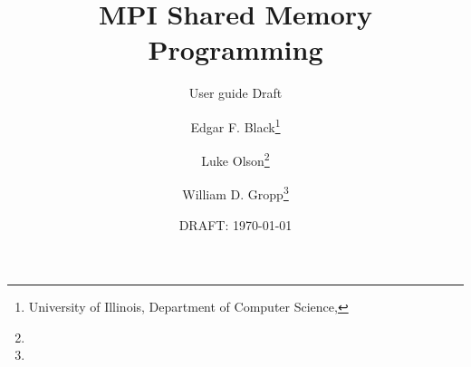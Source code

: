\documentclass[pagesize=auto, fontsize=11pt, DIV=11]{scrartcl}
\title{MPI Shared Memory Programming}
\subtitle{User guide Draft}
\author{%
  Edgar F. Black\thanks{University of Illinois, Department of Computer Science, \mail{efblack2@illinois.edu}}%
  \and Luke Olson\thanks{\mail{lukeo@illinois.edu}}%
  \and William D. Gropp\thanks{\mail{wgropp@illinois.edu}}%
}
\date{DRAFT: \today} %
\begin{document}
\maketitle

\noindent


\begin{comment}

\begin{quote}
  \footnotesize
  The guide will present methods and best practices for efficient use of shared memory in two different contexts: \textbf{hybrid programming} and \textbf{share memory programming}.
\end{quote}
\end{comment}


%





\end{document}
